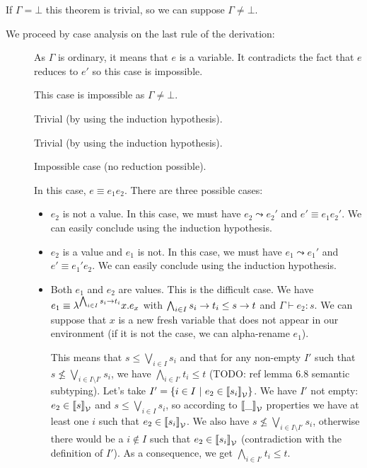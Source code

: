 \documentclass[a4paper]{article}
\theoremstyle{definition}
\begin{document}
        If $\Gamma = \bot$ this theorem is trivial, so we can suppose $\Gamma \neq \bot$.

        We proceed by case analysis on the last rule of the derivation:
        
        \begin{description}
          \item[] As $\Gamma$ is ordinary, it means that $e$ is a variable.
          It contradicts the fact that $e$ reduces to $e'$ so this case is impossible.
          \item[] This case is impossible as $\Gamma \neq \bot$.
          \item[] Trivial (by using the induction hypothesis).
          \item[] Trivial (by using the induction hypothesis).
          \item[] Impossible case (no reduction possible).
          \item[] In this case, $e\equiv e_1 e_2$. There are three possible cases:
          \begin{itemize}
            \item $e_2$ is not a value. In this case, we must have $e_2\leadsto e_2'$
            and $e'\equiv e_1 e_2'$. We can easily conclude using the induction hypothesis.
            \item $e_2$ is a value and $e_1$ is not. In this case, we must have $e_1\leadsto e_1'$
            and $e'\equiv e_1' e_2$. We can easily conclude using the induction hypothesis.
            \item Both $e_1$ and $e_2$ are values. This is the difficult case.
            We have $e_1\equiv \lambda^{\bigwedge_{i\in I}s_i\to t_i}x.e_x$
            with $\bigwedge_{i\in I}s_i\to t_i \leq s\to t$ and $\Gamma \vdash e_2:s$.
            We can suppose that $x$ is a new fresh variable that does not appear in our environment
            (if it is not the case, we can alpha-rename $e_1$).

            This means that $s\leq \bigvee_{i\in I} s_i$ and that for any non-empty $I'$ such that
            $s\not\leq \bigvee_{i\in I\setminus I'} s_i$, we have $\bigwedge_{i\in I'} t_i \leq t$
            (TODO: ref lemma 6.8 semantic subtyping). Let's take $I'=\{i\in I~|~ e_2\in{\llbracket s_i \rrbracket}_{\mathcal{V}}\}$.
            We have $I'$ not empty: $e_2\in{\llbracket s \rrbracket}_{\mathcal{V}}$ and $s\leq \bigvee_{i\in I} s_i$, so according to
            ${\llbracket \_ \rrbracket}_{\mathcal{V}}$ properties we have at least one $i$ such that $e_2\in{\llbracket s_i \rrbracket}_{\mathcal{V}}$.
            We also have $s\not\leq \bigvee_{i\in I\setminus I'} s_i$, otherwise there would be a $i\not\in I$
            such that $e_2\in{\llbracket s_i \rrbracket}_{\mathcal{V}}$ (contradiction with the definition of $I'$).
            As a consequence, we get $\bigwedge_{i\in I'} t_i \leq t$.


\end{itemize}
\end{description}
\end{document}
